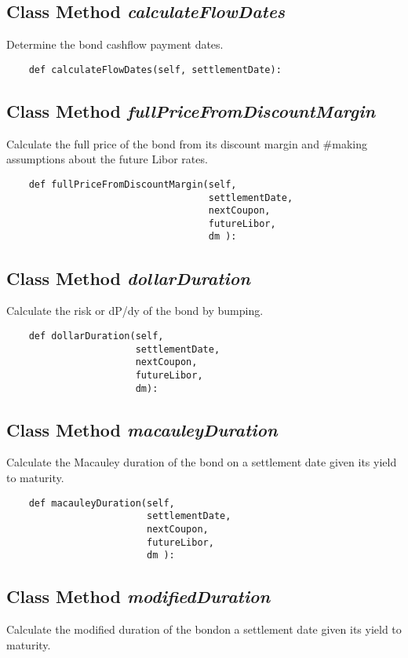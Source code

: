 \documentclass[twoside,11pt]{book}
\begin{document}
\subsection{Class Method {\it calculateFlowDates}}
Determine the bond cashflow payment dates. 

\begin{lstlisting}
    def calculateFlowDates(self, settlementDate):
\end{lstlisting}

\subsection{Class Method {\it fullPriceFromDiscountMargin}}
Calculate the full price of the bond from its discount margin and \#making assumptions about the future Libor rates. 

\begin{lstlisting}
    def fullPriceFromDiscountMargin(self, 
                                    settlementDate,
                                    nextCoupon,
                                    futureLibor,
                                    dm ):
\end{lstlisting}

\subsection{Class Method {\it dollarDuration}}
Calculate the risk or dP/dy of the bond by bumping. 

\begin{lstlisting}
    def dollarDuration(self, 
                       settlementDate, 
                       nextCoupon,
                       futureLibor,
                       dm):
\end{lstlisting}

\subsection{Class Method {\it macauleyDuration}}
Calculate the Macauley duration of the bond on a settlement date given its yield to maturity. 

\begin{lstlisting}
    def macauleyDuration(self,
                         settlementDate,
                         nextCoupon,
                         futureLibor,
                         dm ):
\end{lstlisting}

\subsection{Class Method {\it modifiedDuration}}
Calculate the modified duration of the bondon a settlement date given its yield to maturity. 
\end{document}
